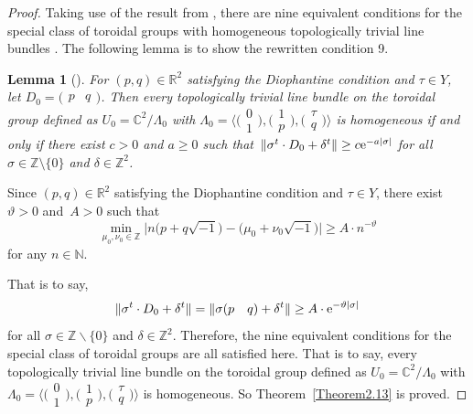 \documentclass[10pt,a4paper]{amsart}
\numberwithin{equation}{section}
\newtheorem{Lemma}[Theorem]{Lemma}
\begin{document}
\begin{proof}
Taking use of the result from \cite{Christian}, there are nine equivalent conditions for the special class of toroidal groups with homogeneous topologically trivial line bundles \cite[Theorem]{Christian}. The following lemma is to show the rewritten condition 9.

\begin{Lemma}[{\cite{Christian}}] \label{Lemma2.14}
 For $(p,q) \in \mathbb{R}^2$ satisfying the Diophantine condition and $\tau \in Y$, let $D_0=\bigl(\begin{matrix}p& q\end{matrix}\bigr)$. Then every topologically trivial line bundle on the toroidal group defined as $U_0=\mathbb{C}^2/\Lambda_0$ with $\Lambda_0=\bigl\langle\bigl(\begin{smallmatrix}0 \\1\end{smallmatrix}\bigr),\bigl(\begin{smallmatrix}1 \\p\end{smallmatrix}\bigr),\bigl(\begin{smallmatrix}\tau \\q\end{smallmatrix}\bigr)\bigr\rangle$ is homogeneous if and only if there exist $ c>0$ and $a \geq 0$ such that~${\|\sigma^t \cdot D_0+ \delta^t\| \geq c{\rm e}^{-a|\sigma|}}$
for all $\sigma \in \mathbb{Z} \setminus \{ 0 \}$ and $\delta \in \mathbb{Z}^2$.
\end{Lemma}

Since $(p,q)\in \mathbb{R}^2$ satisfying the Diophantine condition and $\tau \in Y$, there exist $\vartheta >0$ and~${A>0}$ such that
\[
\underset{\mu_0 ,\nu_0 \in \mathbb{Z}}{\min } \big| n\bigl(p+q\sqrt{-1} \bigr)-\bigl(\mu_0 +\nu_0\sqrt{-1} \bigr)\big| \geq A\cdot n^{-\vartheta }
\]
for any $n \in \mathbb{N}$.

That is to say,
\[\| \sigma^t \cdot D_0+ \delta^t\|=\| \sigma(p\quad q)+ \delta^t\| \geq A\cdot {\rm e}^{-\vartheta|\sigma|}\]
for all $\sigma \in \mathbb{Z} \backslash \{ 0 \}$ and $\delta \in \mathbb{Z}^2$. Therefore, the nine equivalent conditions for the special class of toroidal groups \cite[Theorem]{Christian} are all satisfied here. That is to say, every topologically trivial line bundle on the toroidal group defined as $U_0=\mathbb{C}^2/\Lambda_0$ with $\Lambda_0=\bigl\langle\bigl(\begin{smallmatrix}0 \\1\end{smallmatrix}\bigr),\bigl(\begin{smallmatrix}1 \\p\end{smallmatrix}\bigr),\bigl(\begin{smallmatrix}\tau \\q\end{smallmatrix}\bigr)\bigr\rangle$ is homogeneous. So Theorem~\ref{Theorem2.13} is proved.
\end{proof}
\end{document}
